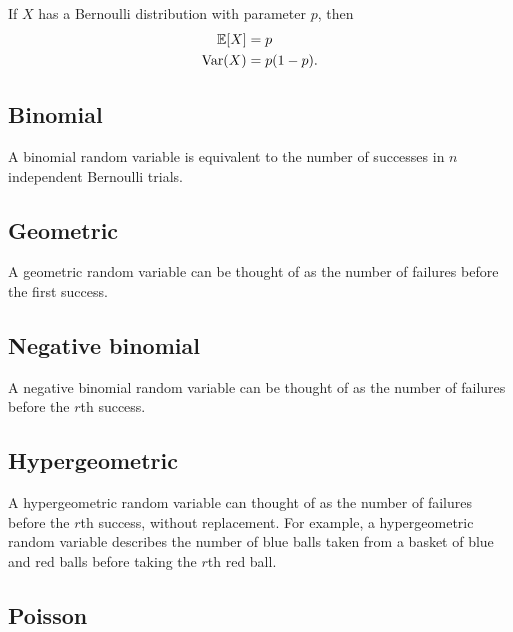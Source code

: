 \begin{proposition}
  If $X$ has a Bernoulli distribution with parameter $p$, then 
  \begin{align*}
    \operatorname{\mathbb{E}}[X] &= p \\
    \operatorname{Var}(X) &= p(1-p).
  \end{align*}
\end{proposition}

\subsection{Binomial}

\begin{remark}
  A binomial random variable is equivalent to the number of successes in $n$ independent Bernoulli trials.
\end{remark}

\subsection{Geometric}

\begin{remark}
  A geometric random variable can be thought of as the number of failures before the first success.
\end{remark}

\subsection{Negative binomial}

\begin{remark}
  A negative binomial random variable can be thought of as the number of failures before the $r$th success.
\end{remark}

\subsection{Hypergeometric}

\begin{remark}
  A hypergeometric random variable can thought of as the number of failures before the $r$th success, without replacement. For example, a hypergeometric random variable describes the number of blue balls taken from a basket of blue and red balls before taking the $r$th red ball.
\end{remark}

\subsection{Poisson}

